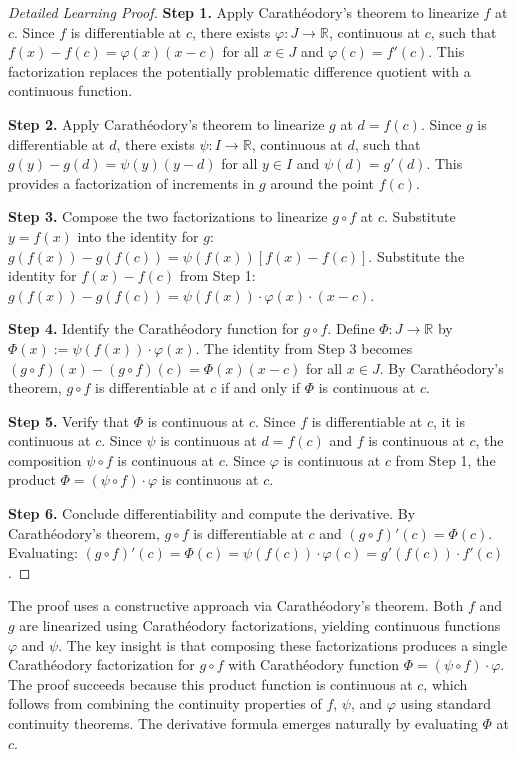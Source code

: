 \begin{proof}[Detailed Learning Proof]
\LRAProofBodyStart

\textbf{Step 1.} Apply Carathéodory's theorem to linearize $f$ at $c$. Since $f$ is differentiable at $c$, there exists $\varphi : J \to \mathbb{R}$, continuous at $c$, such that $f(x) - f(c) = \varphi(x)(x - c)$ for all $x \in J$ and $\varphi(c) = f'(c)$. This factorization replaces the potentially problematic difference quotient with a continuous function.

\textbf{Step 2.} Apply Carathéodory's theorem to linearize $g$ at $d = f(c)$. Since $g$ is differentiable at $d$, there exists $\psi : I \to \mathbb{R}$, continuous at $d$, such that $g(y) - g(d) = \psi(y)(y - d)$ for all $y \in I$ and $\psi(d) = g'(d)$. This provides a factorization of increments in $g$ around the point $f(c)$.

\textbf{Step 3.} Compose the two factorizations to linearize $g \circ f$ at $c$. Substitute $y = f(x)$ into the identity for $g$: $g(f(x)) - g(f(c)) = \psi(f(x))[f(x) - f(c)]$. Substitute the identity for $f(x) - f(c)$ from Step 1: $g(f(x)) - g(f(c)) = \psi(f(x)) \cdot \varphi(x) \cdot (x - c)$.

\textbf{Step 4.} Identify the Carathéodory function for $g \circ f$. Define $\Phi : J \to \mathbb{R}$ by $\Phi(x) := \psi(f(x)) \cdot \varphi(x)$. The identity from Step 3 becomes $(g \circ f)(x) - (g \circ f)(c) = \Phi(x)(x - c)$ for all $x \in J$. By Carathéodory's theorem, $g \circ f$ is differentiable at $c$ if and only if $\Phi$ is continuous at $c$.

\textbf{Step 5.} Verify that $\Phi$ is continuous at $c$. Since $f$ is differentiable at $c$, it is continuous at $c$. Since $\psi$ is continuous at $d = f(c)$ and $f$ is continuous at $c$, the composition $\psi \circ f$ is continuous at $c$. Since $\varphi$ is continuous at $c$ from Step 1, the product $\Phi = (\psi \circ f) \cdot \varphi$ is continuous at $c$.

\textbf{Step 6.} Conclude differentiability and compute the derivative. By Carathéodory's theorem, $g \circ f$ is differentiable at $c$ and $(g \circ f)'(c) = \Phi(c)$. Evaluating: $(g \circ f)'(c) = \Phi(c) = \psi(f(c)) \cdot \varphi(c) = g'(f(c)) \cdot f'(c)$.
\end{proof}

\begin{remark*}
The proof uses a constructive approach via Carathéodory's theorem. Both $f$ and $g$ are linearized using Carathéodory factorizations, yielding continuous functions $\varphi$ and $\psi$. The key insight is that composing these factorizations produces a single Carathéodory factorization for $g \circ f$ with Carathéodory function $\Phi = (\psi \circ f) \cdot \varphi$. The proof succeeds because this product function is continuous at $c$, which follows from combining the continuity properties of $f$, $\psi$, and $\varphi$ using standard continuity theorems. The derivative formula emerges naturally by evaluating $\Phi$ at $c$.
\end{remark*}

